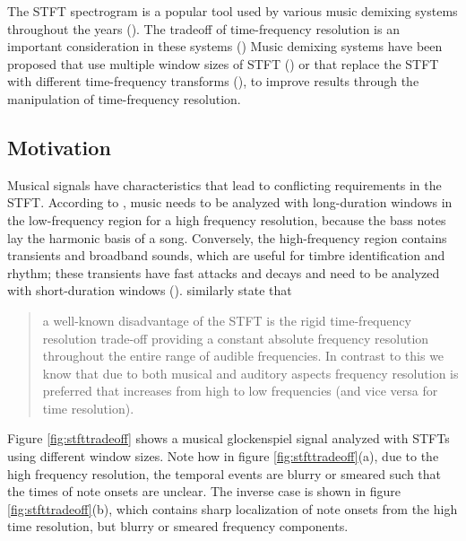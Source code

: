 \documentclass[report.tex]{subfiles}
\begin{document}
The STFT spectrogram is a popular tool used by various music demixing systems throughout the years (\cite{musicsepgood, musicsepsurvey, sisec2018, fitzgerald1, umx, plumbley1, plumbley2}). The tradeoff of time-frequency resolution is an important consideration in these systems (\cite{tftradeoff1, tftradeoff2}) Music demixing systems have been proposed that use multiple window sizes of STFT (\cite{fitzgerald2, driedger}) or that replace the STFT with different time-frequency transforms (\cite{fitzgerald2, cqtseparation, bettermusicsep}), to improve results through the manipulation of time-frequency resolution.

\subsection{Motivation}
\label{sec:motivation}

Musical signals have characteristics that lead to conflicting requirements in the STFT. According to \textcite{doerflerphd}, music needs to be analyzed with long-duration windows in the low-frequency region for a high frequency resolution, because the bass notes lay the harmonic basis of a song. Conversely, the high-frequency region contains transients and broadband sounds, which are useful for timbre identification and rhythm; these transients have fast attacks and decays and need to be analyzed with short-duration windows (\cite{doerflerphd}). \textcite{cqtransient} similarly state that

\begin{quote}
	a well-known disadvantage of the STFT is the rigid time-frequency resolution trade-off providing a constant absolute frequency resolution throughout the entire range of audible frequencies. In contrast to this we know that due to both musical and auditory aspects frequency resolution is preferred that increases from high to low frequencies (and vice versa for time resolution).
\end{quote}

Figure \ref{fig:stfttradeoff} shows a musical glockenspiel signal analyzed with STFTs using different window sizes. Note how in figure \ref{fig:stfttradeoff}(a), due to the high frequency resolution, the temporal events are blurry or smeared such that the times of note onsets are unclear. The inverse case is shown in figure \ref{fig:stfttradeoff}(b), which contains sharp localization of note onsets from the high time resolution, but blurry or smeared frequency components.
\end{document}
